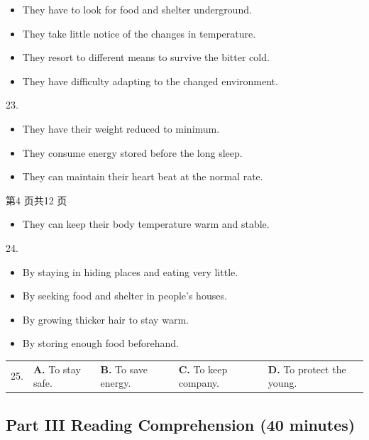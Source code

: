 \documentclass[UTF8,11pt]{ctexart}
\begin{document}
\begin{itemize}[leftmargin=2em,itemsep=.2em,topsep=.4em]\item[A.] They have to look for food and shelter underground.
\item[B.] They take little notice of the changes in temperature.
\item[C.] They resort to different means to survive the bitter cold.
\item[D.] They have difficulty adapting to the changed environment.
\end{itemize}

23.


\begin{itemize}[leftmargin=2em,itemsep=.2em,topsep=.4em]\item[A.] They have their weight reduced to minimum.
\item[B.] They consume energy stored before the long sleep.
\item[C.] They can maintain their heart beat at the normal rate.
\end{itemize}

第4 页共12 页


\begin{itemize}[leftmargin=2em,itemsep=.2em,topsep=.4em]\item[D.] They can keep their body temperature warm and stable.
\end{itemize}

24.


\begin{itemize}[leftmargin=2em,itemsep=.2em,topsep=.4em]\item[A.] By staying in hiding places and eating very little.
\item[B.] By seeking food and shelter in people’s houses.
\item[C.] By growing thicker hair to stay warm.
\item[D.] By storing enough food beforehand.
\end{itemize}

\noindent\begin{tabularx}{\linewidth}{@{}lXXXX@{}}25. & \textbf{A.} To stay safe. & \textbf{B.} To save energy. & \textbf{C.} To keep company. & \textbf{D.} To protect the young.\\\end{tabularx}\par

\subsection*{\textbf{Part} III \textbf{Reading Comprehension} \textbf{(40 minutes)}}
\end{document}
